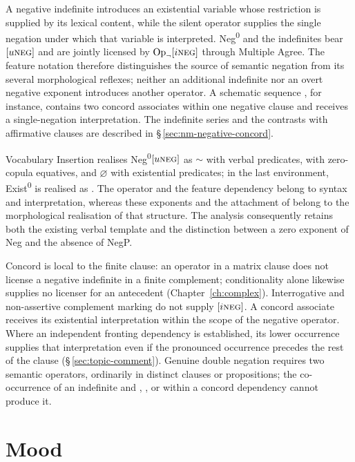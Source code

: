A negative indefinite introduces an existential variable whose restriction is
supplied by its lexical content, while the silent operator supplies the single
negation under which that variable is interpreted. Neg\textsuperscript{0}
and the indefinites bear $[u\textsc{neg}]$ and are jointly licensed by
$\mathrm{Op}_{\neg}[i\textsc{neg}]$ through Multiple Agree. The feature
notation therefore distinguishes the source of semantic negation from its
several morphological reflexes; neither an additional indefinite nor an
overt negative exponent introduces another operator. A schematic sequence
, for instance, contains two
concord associates within one negative clause and receives a single-negation
interpretation. The indefinite series and the contrasts with affirmative
clauses are described in §\,\ref{sec:nm-negative-concord}.

Vocabulary Insertion realises Neg\textsuperscript{0}$[u\textsc{neg}]$ as
 $\sim$  with verbal predicates,  with
zero-copula equatives, and $\varnothing$ with existential predicates; in the
last environment, Exist\textsuperscript{0} is realised as .
The operator and the feature dependency belong to syntax and interpretation,
whereas these exponents and the attachment of  belong to the
morphological realisation of that structure. The analysis consequently retains
both the existing verbal template and the distinction between a zero exponent
of Neg and the absence of NegP.

Concord is local to the finite clause: an operator in a matrix clause does
not license a negative indefinite in a finite complement; conditionality alone likewise supplies no licenser
for an antecedent (Chapter~\ref{ch:complex}). Interrogative  and non-assertive
complement marking do not supply $[i\textsc{neg}]$. A concord associate
receives its existential interpretation within the scope of the negative
operator. Where an independent fronting dependency is established, its lower
occurrence supplies that interpretation even if the pronounced occurrence
precedes the rest of the clause
(§\,\ref{sec:topic-comment}). Genuine double negation requires two semantic
operators, ordinarily in distinct clauses or propositions; the co-occurrence
of an indefinite and , , or  within a concord
dependency cannot produce it.

\section{Mood}\label{sec:mood}

